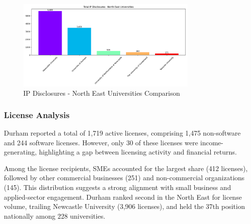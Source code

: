 \documentclass[journal,onecolumn, 10pt,draftclsnofoot]{IEEEtran}
\begin{document}

\begin{figure}[h]
\centering
\includegraphics[width=0.8\textwidth]{Fig/figure20.ip_ne_comparison.png}
\caption{IP Disclosures - North East Universities Comparison}
\label{fig:ip-ne-comparison}
\end{figure}

\subsubsection{License Analysis}

Durham reported a total of 1,719 active licenses, comprising 1,475 non-software and 244 software licenses. However, only 30 of these licenses were income-generating, highlighting a gap between licensing activity and financial returns.

Among the license recipients, SMEs accounted for the largest share (412 licenses), followed by other commercial businesses (251) and non-commercial organizations (145). This distribution suggests a strong alignment with small business and applied-sector engagement. Durham ranked second in the North East for license volume, trailing Newcastle University (3,906 licenses), and held the 37th position nationally among 228 universities.
\end{document}
